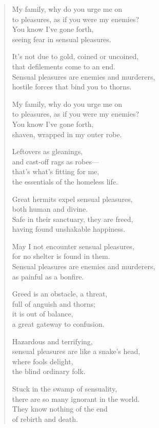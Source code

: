 \documentclass[12pt,openany]{book}%
\begin{document}
\begin{verse}
My family, why do you urge me on \\
to pleasures, as if you were my enemies? \\
You know I’ve gone forth, \\
seeing fear in sensual pleasures. 

It’s not due to gold, coined or uncoined, \\
that defilements come to an end. \\
Sensual pleasures are enemies and murderers, \\
hostile forces that bind you to thorns. 

My family, why do you urge me on \\
to pleasures, as if you were my enemies? \\
You know I’ve gone forth, \\
shaven, wrapped in my outer robe. 

Leftovers as gleanings, \\
and cast-off rags as robes—\\
that’s what’s fitting for me, \\
the essentials of the homeless life. 

Great hermits expel sensual pleasures, \\
both human and divine. \\
Safe in their sanctuary, they are freed, \\
having found unshakable happiness. 

May I not encounter sensual pleasures, \\
for no shelter is found in them. \\
Sensual pleasures are enemies and murderers, \\
as painful as a bonfire. 

Greed is an obstacle, a threat, \\
full of anguish and thorns; \\
it is out of balance, \\
a great gateway to confusion. 

Hazardous and terrifying, \\
sensual pleasures are like a snake’s head, \\
where fools delight, \\
the blind ordinary folk. 

Stuck in the swamp of sensuality, \\
there are so many ignorant in the world. \\
They know nothing of the end \\
of rebirth and death. 


\end{verse}
\end{document}
